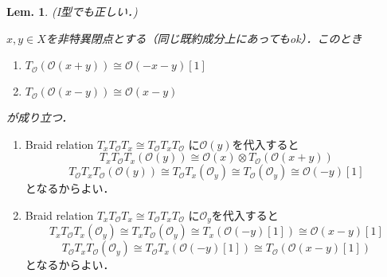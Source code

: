 \documentclass[uplatex,a4paper,11pt]{jsarticle}
\makeatletter
\theoremstyle{mystyle} %
\newtheorem{lemma}{Lem.}[section]
\renewenvironment{proof}[1][\proofname]{\par
 \pushQED{\qed}%
 \normalfont \topsep6\p@\@plus6\p@\relax
 \trivlist
 \item[\hskip\labelsep
 \itshape
 {\bf\underline{#1}}]\ignorespaces
}{%
 \popQED\endtrivlist\@endpefalse
}
\makeatother
\begin{document}
\begin{lemma}\label{calc_of_twist_functors2}
	(I型でも正しい．)

	$x, y \in X$を非特異閉点とする（同じ既約成分上にあってもok）．このとき
	\begin{enumerate}
		\item $T_\mathcal{O}(\mathcal{O}(x + y))\cong \mathcal{O}( - x - y)[1]$
		\item $T_\mathcal{O}(\mathcal{O}(x - y))\cong \mathcal{O}(x - y)$
	\end{enumerate}
	が成り立つ．
\end{lemma}
\begin{proof}
	\begin{enumerate}
		\item Braid relation $T_x T_\mathcal{O}T_x \cong T_\mathcal{O}T_x T_\mathcal{O}$ に$\mathcal{O}(y)$を代入すると$$T_x T_\mathcal{O}T_x(\mathcal{O}(y))\cong \mathcal{O}(x)\otimes T_\mathcal{O}(\mathcal{O}(x + y))$$$$T_\mathcal{O}T_x T_\mathcal{O}(\mathcal{O}(y))\cong T_\mathcal{O}T_x (\mathcal{O}_y) \cong T_\mathcal{O}(\mathcal{O}_y) \cong \mathcal{O}( - y)[1]$$となるからよい．
		\item Braid relation $T_x T_\mathcal{O}T_x \cong T_\mathcal{O}T_x T_\mathcal{O}$ に$\mathcal{O}_y$を代入すると$$T_x T_\mathcal{O}T_x(\mathcal{O}_y)\cong T_x T_\mathcal{O}(\mathcal{O}_y) \cong T_x(\mathcal{O}( - y)[1])\cong \mathcal{O}(x - y)[1]$$$$T_\mathcal{O}T_x T_\mathcal{O}(\mathcal{O}_y)\cong T_\mathcal{O}T_x (\mathcal{O}( - y)[1]) \cong T_\mathcal{O}(\mathcal{O}(x - y)[1])$$となるからよい．
	\end{enumerate}
\end{proof}
\end{document}
